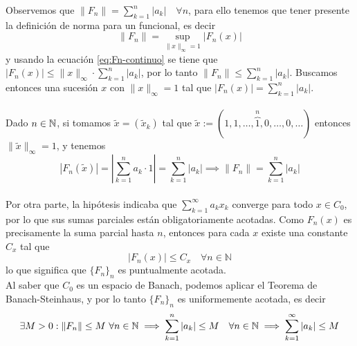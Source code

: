\noindent
Observemos que $\|F_n\| = \sum_{k=1}^{n} |a_k| \quad \forall n$, para ello tenemos que tener presente la definición de norma para un funcional, es decir
\begin{equation*}
    \|F_n\| = \sup_{\|x\|_{\infty} = 1} |F_n(x)| 
\end{equation*}
y usando la ecuación \ref{eq:Fn-continuo} se tiene que $|F_n(x)| \leq \|x\|_{\infty} \cdot \sum_{k=1}^{n} |a_k|$, por lo tanto $\|F_n\| \leq \sum_{k=1}^{n} |a_k|$. Buscamos entonces una sucesión $x$ con $\|x\|_{\infty} = 1$ tal que $|F_n(x)| = \sum_{k=1}^{n} |a_k|$. \\ \\
\noindent
Dado $n\in \mathbb{N}$, si tomamos $\tilde{x} = (\tilde{x}_k)$ tal que $\tilde{x} := (1, 1, \dots, \overbrace{1}^{n}, 0, \dots, 0, \dots)$ entonces $\|\tilde{x}\|_{\infty} = 1$, y tenemos
\begin{equation}\label{eq:igualdad-norma-Fn}
    |F_n(\tilde{x})| = \left|\sum_{k=1}^{n} a_k \cdot 1\right| = \sum_{k=1}^{n} |a_k| \implies \|F_n\| = \sum_{k=1}^{n} |a_k|
\end{equation}
\\
\noindent
Por otra parte, la hipótesis indicaba que $\sum\limits_{k=1}^{\infty} a_k x_k$ converge para todo $x \in C_0$, por lo que sus sumas parciales están obligatoriamente acotadas. Como $F_n(x)$ es precisamente la suma parcial hasta $n$, entonces para cada $x$ existe una constante $C_x$ tal que
$$|F_n(x)| \leq C_x \quad \forall n \in \mathbb{N}$$
lo que significa que $\{F_n\}_n$ es puntualmente acotada.  \\

\noindent %
Al saber que $C_0$ es un espacio de Banach, podemos aplicar el Teorema de Banach-Steinhaus, y por lo tanto $\{F_n\}_n$ es uniformemente acotada, es decir
$$\exists M > 0 :\|F_n\| \leq M \ \forall n\in \mathbb{N} \implies \sum_{k=1}^{n} |a_k| \leq M \quad \forall n\in \mathbb{N} \implies \sum_{k=1}^{\infty} |a_k| \leq M$$

